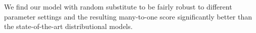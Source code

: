 We find our model with random substitute to be fairly robust to
different parameter settings and the resulting many-to-one score
significantly better than the state-of-the-art distributional models.







